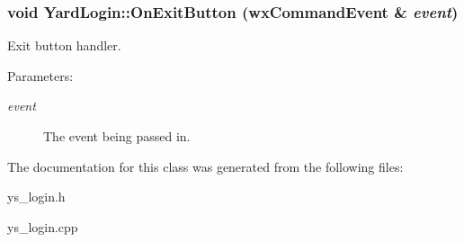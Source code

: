 \subsubsection{\setlength{\rightskip}{0pt plus 5cm}void Yard\-Login::On\-Exit\-Button (wx\-Command\-Event \& {\em event})}\label{classYardLogin_a2}


Exit button handler. 

\begin{Desc}
\item[Parameters:]
\begin{description}
\item[{\em event}]The event being passed in. \end{description}
\end{Desc}


The documentation for this class was generated from the following files:\begin{CompactItemize}
\item 
ys\_\-login.h\item 
ys\_\-login.cpp\end{CompactItemize}
